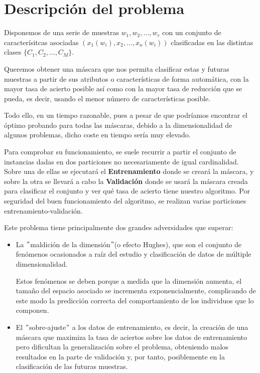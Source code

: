 \section{Descripción del problema}
	Disponemos de una serie de muestras $w_1, w_2, \dots, w_r$ con un conjunto de caracterísitcas
	asociadas $(x_1(w_i), x_2, \dots, x_n(w_i))$ clasificadas en las distintas clases $\{C_1, C_2,
	\dots, C_M\}$.
	
	Queremos obtener una máscara que nos permita clasificar estas y futuras muestras a partir
	de sus atributos o características de forma automática, con la mayor tasa de acierto posible
	así como con la mayor tasa de reducción que se pueda, es decir, usando el menor número de
	características posible.
	
	Todo ello, en un tiempo razonable, pues a pesar de que podríamos encontrar el óptimo probando
	para todas las máscaras, debido a la dimensionalidad de algunos problemas, dicho coste en
	tiempo sería muy elevado.
	
	Para comprobar su funcionamiento, se suele recurrir a partir el conjunto de instancias dadas
	en dos particiones no necesariamente de igual cardinalidad. Sobre una de ellas se ejecutará
	el \textbf{Entrenamiento} donde se creará la máscara, y sobre la otra se llevará a cabo la
	\textbf{Validación} donde se usará la máscara creada para clasificar el conjunto y ver qué
	tasa de acierto tiene nuestro algoritmo. Por seguridad del buen funcionamiento del algoritmo,
	se realizan varias particiones entrenamiento-validación.
	
	Este problema tiene principalmente dos grandes adversidades que superar:
	\begin{itemize}
		\item La $"$maldición de la dimensión$"$(o efecto Hughes), que son el conjunto de fenómenos
		ocasionados a raíz del estudio y clasificación de datos de múltiple dimensionalidad.
		
		Estos fenómenos se deben porque a medida que la dimensión aumenta, el tamaño del espacio
		asociado se incrementa exponencialmente, complicando de este modo la predicción correcta
		del comportamiento de los individuos que lo componen.
		
		\item El $"$sobre-ajuste$"$ a los datos de entrenamiento, es decir, la creación de una
		máscara que maximiza la tasa de aciertos sobre los datos de entrenamiento pero dificultan
		la generalización sobre el problema, obteniendo malos resultados en la parte de validación
		y, por tanto, posiblemente en la clasificación de las futuras muestras.
	\end{itemize}

